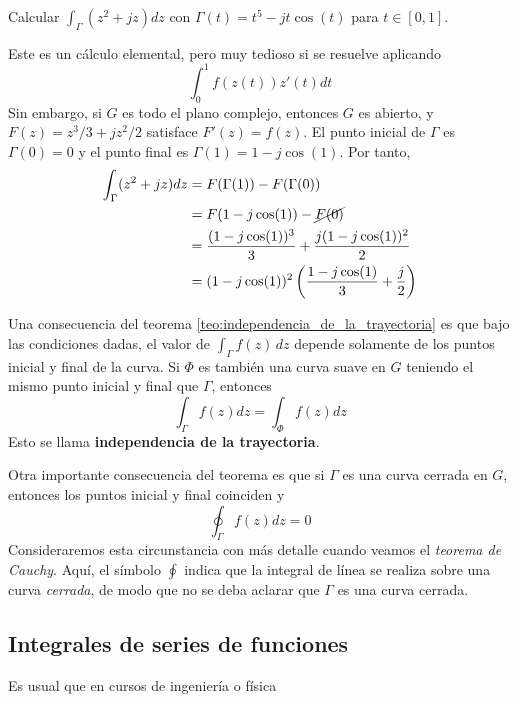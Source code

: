 \begin{example}
  Calcular $\int_\Gamma (z^2+jz)dz$ con $\Gamma(t)=t^5-jt\cos(t)$ para $t\in[0,1]$.

  Este es un cálculo elemental, pero muy tedioso si se resuelve aplicando 
  $$
  \int_0^1 f(z(t))z'(t)dt 
  $$
  Sin embargo, si $G$ es todo el plano complejo, entonces $G$ es abierto, y $F(z)=z^3/3 +jz^2/2$ satisface $F'(z)=f(z)$. El punto inicial de $\Gamma$ es $\Gamma(0)=0$ y el punto final es $\Gamma(1)=1-j\cos(1)$. Por tanto,
  \begin{align*}
    \int_\Gamma (z^2 +jz)dz &= F(\Gamma(1))-F(\Gamma(0)) \\ 
                            &= F(1-j\cos(1))-\cancel{F(0)} \\ 
                            &= \frac{(1-j\cos(1))^3}{3}+\frac{j(1-j\cos(1))^2}{2} \\ 
                            &= (1-j\cos(1))^2 \left( \frac{1-j\cos(1)}{3} + \frac{j}{2} \right)
  \end{align*}
\end{example}

Una consecuencia del teorema \ref{teo:independencia_de_la_trayectoria} es que bajo las condiciones dadas, el valor de $\int_\Gamma f(z)\,dz$ depende solamente de los puntos inicial y final de la curva. Si $\varPhi$ es también una curva suave en $G$ teniendo el mismo punto inicial y final que $\Gamma$, entonces
$$
\int_\Gamma f(z)dz = \int_\varPhi f(z)dz
$$
Esto se llama \textbf{independencia de la trayectoria}.

Otra importante consecuencia del teorema es que si $\Gamma$ es una curva cerrada en $G$, entonces los puntos inicial y final coinciden y
$$
\oint_\Gamma f(z)dz = 0
$$
Consideraremos esta circunstancia con más detalle cuando veamos el \textit{teorema de Cauchy}. Aquí, el símbolo $\oint$ indica que la integral de línea se realiza sobre una curva \textit{cerrada}, de modo que no se deba aclarar que $\Gamma$ es una curva cerrada.

\subsection{Integrales de series de funciones}

Es usual que en cursos de ingeniería o física 
